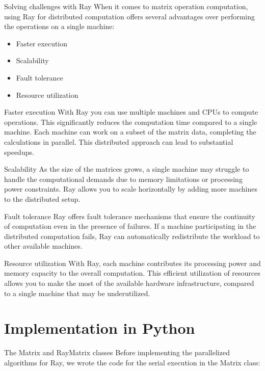 \documentclass{beamer}
\begin{document}
\begin{frame}{Solving challenges with Ray}
    When it comes to matrix operation computation, using Ray for distributed computation offers several advantages over performing the operations on a single machine:
    \begin{itemize}
        \item Faster execution
        \item Scalability
        \item Fault tolerance
        \item Resource utilization
    \end{itemize}
\end{frame}

\begin{frame}{Faster execution}
    With Ray you can use multiple machines and CPUs to compute operations. This significantly reduces the computation time compared to a single machine. Each machine can work on a subset of the matrix data, completing the calculations in parallel. This distributed approach can lead to substantial speedups.
\end{frame}

\begin{frame}{Scalability}
    As the size of the matrices grows, a single machine may struggle to handle the computational demands due to memory limitations or processing power constraints. Ray allows you to scale horizontally by adding more machines to the distributed setup.
\end{frame}

\begin{frame}{Fault tolerance}
    Ray offers fault tolerance mechanisms that ensure the continuity of computation even in the presence of failures. If a machine participating in the distributed computation fails, Ray can automatically redistribute the workload to other available machines.
\end{frame}

\begin{frame}{Resource utilization}
    With Ray, each machine contributes its processing power and memory capacity to the overall computation. This efficient utilization of resources allows you to make the most of the available hardware infrastructure, compared to a single machine that may be underutilized.
\end{frame}

\section{Implementation in Python}
\begin{frame}{The Matrix and RayMatrix classes}
    Before implementing the parallelized algorithms for Ray, we wrote the code for the serial execution in the \alert{Matrix} class:
\end{frame}
\end{document}
